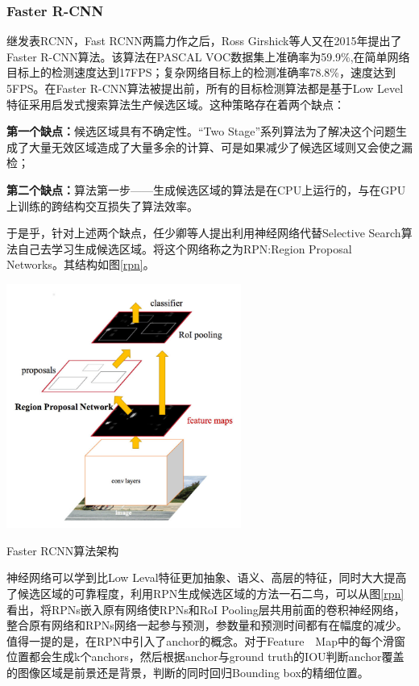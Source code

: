 \subsubsection{Faster R-CNN}
继发表RCNN，Fast RCNN两篇力作之后，Ross Girshick等人又在2015年提出了Faster R-CNN\cite{fasterrcnn}算法。该算法在PASCAL VOC数据集上准确率为59.9\%,在简单网络目标上的检测速度达到17FPS；复杂网络目标上的检测准确率78.8\%，速度达到5FPS。在Faster R-CNN算法被提出前，所有的目标检测算法都是基于Low Level特征采用启发式搜索算法生产候选区域。这种策略存在着两个缺点：

\textbf{第一个缺点：}候选区域具有不确定性。“Two Stage”系列算法为了解决这个问题生成了大量无效区域造成了大量多余的计算、可是如果减少了候选区域则又会使之漏检；

\textbf{第二个缺点：}算法第一步——生成候选区域的算法是在CPU上运行的，与在GPU上训练的跨结构交互损失了算法效率。

于是乎，针对上述两个缺点，任少卿等人提出利用神经网络代替Selective Search算法自己去学习生成候选区域。将这个网络称之为RPN:Region Proposal Networks。其结构如图\ref{rpn}。
\begin{uscfigure}
	\includegraphics[width=\textwidth,height=8cm]{./Pictures/faster_rcnn.jpg}	
	\caption{Faster RCNN算法架构}	
	\label{rpn}
\end{uscfigure}
神经网络可以学到比Low Leval特征更加抽象、语义、高层的特征，同时大大提高了候选区域的可靠程度，利用RPN生成候选区域的方法一石二鸟，可以从图\ref{rpn}看出，将RPNs嵌入原有网络使RPNs和RoI Pooling层共用前面的卷积神经网络，整合原有网络和RPNs网络一起参与预测，参数量和预测时间都有在幅度的减少。值得一提的是，在RPN中引入了anchor的概念。对于Feature　Map中的每个滑窗位置都会生成k个anchors，然后根据anchor与ground truth的IOU判断anchor覆盖的图像区域是前景还是背景，判断的同时回归Bounding box的精细位置。

